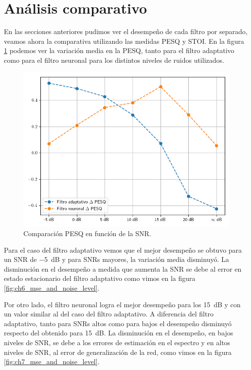 \section{Análisis comparativo}

En las secciones anteriores pudimos ver el desempeño de cada filtro por separado, veamos ahora la comparativa utilizando las medidas PESQ y STOI. En la figura \ref{fig:ch8_pesq_comparison} podemos ver la variación media en la PESQ, tanto para el filtro adaptativo como para el filtro neuronal para los distintos niveles de ruidos utilizados.

\begin{figure}[h]
	\centering
	\centerline{\includegraphics[scale=0.75]{images/ch8/comparison_pesq.png}}
	\caption{Comparación PESQ en función de la SNR.}
	\label{fig:ch8_pesq_comparison}
\end{figure}

Para el caso del filtro adaptativo vemos que el mejor desempeño se obtuvo para un SNR de \SI{-5}{dB} y para SNRs mayores, la variación media disminuyó. La disminución en el desempeño a medida que aumenta la SNR se debe al error en estado estacionario del filtro adaptativo como vimos en la figura \ref{fig:ch6_mse_and_noise_level}.

Por otro lado, el filtro neuronal logra el mejor desempeño para los \SI{15}{dB} y con un valor similar al del caso del filtro adaptativo. A diferencia del filtro adaptativo, tanto para SNRs altos como para bajos el desempeño disminuyó respecto del obtenido para \SI{15}{dB}. La disminución en el desempeño, en bajos niveles de SNR, se debe a los errores de estimación en el espectro y en altos niveles de SNR, al error de generalización de la red, como vimos en la figura \ref{fig:ch7_mse_and_noise_level}.	

